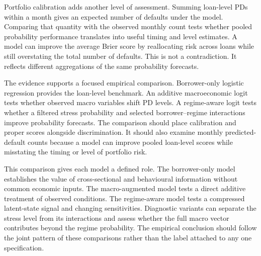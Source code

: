 Portfolio calibration adds another level of assessment. Summing loan-level PDs within a month gives an expected number of defaults under the model. Comparing that quantity with the observed monthly count tests whether pooled probability performance translates into useful timing and level estimates. A model can improve the average Brier score by reallocating risk across loans while still overstating the total number of defaults. This is not a contradiction. It reflects different aggregations of the same probability forecasts.

The evidence supports a focused empirical comparison. Borrower-only logistic regression provides the loan-level benchmark. An additive macroeconomic logit tests whether observed macro variables shift PD levels. A regime-aware logit tests whether a filtered stress probability and selected borrower--regime interactions improve probability forecasts. The comparison should place calibration and proper scores alongside discrimination. It should also examine monthly predicted-default counts because a model can improve pooled loan-level scores while misstating the timing or level of portfolio risk.

This comparison gives each model a defined role. The borrower-only model establishes the value of cross-sectional and behavioural information without common economic inputs. The macro-augmented model tests a direct additive treatment of observed conditions. The regime-aware model tests a compressed latent-state signal and changing sensitivities. Diagnostic variants can separate the stress level from its interactions and assess whether the full macro vector contributes beyond the regime probability. The empirical conclusion should follow the joint pattern of these comparisons rather than the label attached to any one specification.
